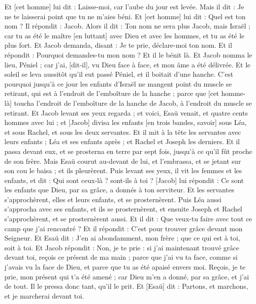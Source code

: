 \begin{multicols}{2}
Et [cet homme] lui dit : Laisse-moi, car l'aube du jour est levée. Mais il dit : Je ne te laisserai point que tu ne m'aies béni.
Et [cet homme] lui dit : Quel est ton nom ? Il répondit : Jacob.
Alors il dit : Ton nom ne sera plus Jacob, mais Israël ; car tu as été le maître [en luttant] avec Dieu et avec les hommes, et tu as été le plus fort.
Et Jacob demanda, disant : Je te prie, déclare-moi ton nom. Et il répondit : Pourquoi demandes-tu mon nom ? Et il le bénit là.
Et Jacob nomma le lieu, Péniel ; car j'ai, [dit-il], vu Dieu face à face, et mon âme a été délivrée.
Et le soleil se leva aussitôt qu'il eut passé Péniel, et il boitait d'une hanche.
C'est pourquoi jusqu'à ce jour les enfants d'Israël ne mangent point du muscle se retirant, qui est à l'endroit de l'emboîture de la hanche ; parce que [cet homme-là] toucha l'endroit de l'emboîture de la hanche de Jacob, à l'endroit du muscle se retirant.
\VerseOne{}Et Jacob levant ses yeux regarda ; et voici, Esaü venait, et quatre cents hommes avec lui ; et [Jacob] divisa les enfants [en trois bandes, savoir] sous Léa, et sous Rachel, et sous les deux servantes.
Et il mit à la tête les servantes avec leurs enfants ; Léa et ses enfants après ; et Rachel et Joseph les derniers.
Et il passa devant eux, et se prosterna en terre par sept fois, jusqu'à ce qu'il fût proche de son frère.
Mais Esaü courut au-devant de lui, et l'embrassa, et se jetant sur son cou le baisa ; et ils pleurèrent.
Puis levant ses yeux, il vit les femmes et les enfants, et dit : Qui sont ceux-là ? sont-ils à toi ? [Jacob] lui répondit : Ce sont les enfants que Dieu, par sa grâce, a donnés à ton serviteur.
Et les servantes s'approchèrent, elles et leurs enfants, et se prosternèrent.
Puis Léa aussi s'approcha avec ses enfants, et ils se prosternèrent, et ensuite Joseph et Rachel s'approchèrent, et se prosternèrent aussi.
Et il dit : Que veux-tu faire avec tout ce camp que j'ai rencontré ? Et il répondit : C'est pour trouver grâce devant mon Seigneur.
Et Esaü dit : J'en ai abondamment, mon frère ; que ce qui est à toi, soit à toi.
Et Jacob répondit : Non, je te prie : si j'ai maintenant trouvé grâce devant toi, reçois ce présent de ma main ; parce que j'ai vu ta face, comme si j'avais vu la face de Dieu, et parce que tu as été apaisé envers moi.
Reçois, je te prie, mon présent qui t'a été amené ; car Dieu m'en a donné, par sa grâce, et j'ai de tout. Il le pressa donc tant, qu'il le prit.
Et [Esaü] dit : Partons, et marchons, et je marcherai devant toi.

\end{multicols}
